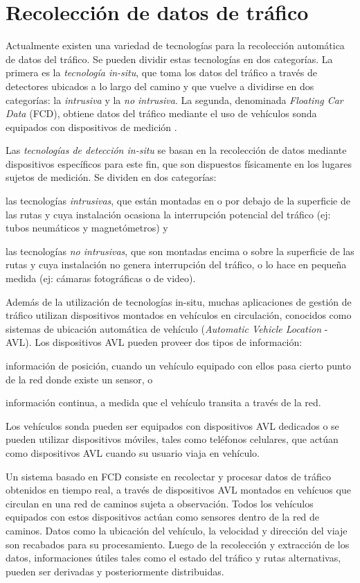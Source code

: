 \section{Recolección de datos de tráfico}
\label{sec:recoleccion_datos}

Actualmente existen una variedad de tecnologías para la recolección automática de datos del tráfico. Se pueden dividir estas tecnologías en dos categorías. La primera es la \emph{tecnología in-situ}, que toma los datos del tráfico a través de detectores ubicados a lo largo del camino y que vuelve a dividirse en dos categorías: la \emph{intrusiva} y la \emph{no intrusiva}. La segunda, denominada \emph{Floating Car Data} (FCD), obtiene datos del tráfico mediante el uso de vehículos sonda equipados con dispositivos de medición \cite{mimbela2003summary}.

Las \emph{tecnologías de detección in-situ} se basan en la recolección de datos mediante dispositivos específicos para este fin, que son dispuestos físicamente en los lugares sujetos de medición. Se dividen en dos categorías: \begin{enumerate*}[a)] \item las tecnologías \emph{intrusivas}, que están montadas en o por debajo de la superficie de las rutas y cuya instalación ocasiona la interrupción potencial del tráfico (ej: tubos neumáticos y magnetómetros) y \item las tecnologías \emph{no intrusivas}, que son montadas encima o sobre la superficie de las rutas y cuya instalación no genera interrupción del tráfico, o lo hace en pequeña medida (ej: cámaras fotográficas o de video).\end{enumerate*}

Además de la utilización de tecnologías in-situ, muchas aplicaciones de gestión de tráfico utilizan dispositivos montados en vehículos en circulación, conocidos como sistemas de ubicación automática de vehículo (\emph{Automatic Vehicle Location} - AVL). Los dispositivos AVL pueden proveer dos tipos de información: \begin{enumerate*}[a)]
\item información de posición, cuando un vehículo equipado con ellos pasa cierto punto de la red donde existe un sensor, o \item información continua, a medida que el vehículo transita a través de la red.
\end{enumerate*}
Los vehículos sonda pueden ser equipados con dispositivos AVL dedicados o se pueden utilizar dispositivos móviles, tales como teléfonos celulares, que actúan como dispositivos AVL cuando su usuario viaja en vehículo.  

Un sistema basado en FCD consiste en recolectar y procesar datos de tráfico obtenidos en tiempo real, a través de dispositivos AVL montados en vehícuos que circulan en una red de caminos sujeta a observación. Todos los vehículos equipados con estos dispositivos actúan como sensores dentro de la red de caminos. Datos como la ubicación del vehículo, la velocidad y dirección del viaje son recabados para su procesamiento. Luego de la recolección y extracción de los datos, informaciones útiles tales como el estado del tráfico y rutas alternativas, pueden ser derivadas y posteriormente distribuidas.

